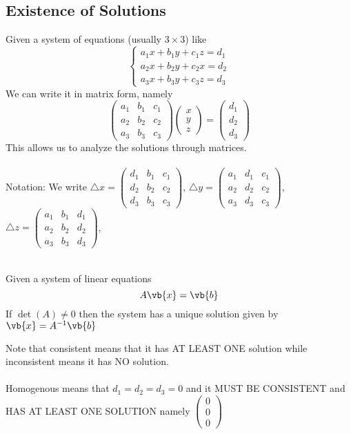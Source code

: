 \documentclass[a4paper]{article}
\begin{document}
\subsection{Existence of Solutions}
Given a system of equations (usually $3\times 3$) like $$\begin{cases}
a_1x+b_1y+c_1z=d_1\\
a_2x+b_2y+c_2x=d_2\\
a_3x+b_3y+c_3z=d_3
\end{cases}$$ We can write it in matrix form, namely $$\begin{pmatrix}
a_1 & b_1 & c_1\\
a_2 & b_2 & c_2\\
a_3 & b_3 & c_3
\end{pmatrix}\begin{pmatrix}
x\\ y\\ z
\end{pmatrix}=\begin{pmatrix}
d_1\\ d_2\\ d_3
\end{pmatrix}$$
This allows us to analyze the solutions through matrices. \\~\\
Notation: We write $\triangle x=\begin{pmatrix}
d_1 & b_1 & c_1\\
d_2 & b_2 & c_2\\
d_3 & b_3 & c_3
\end{pmatrix}$, $\triangle y=\begin{pmatrix}
a_1 & d_1 & c_1\\
a_2 & d_2 & c_2\\
a_3 & d_3 & c_3
\end{pmatrix}$, $\triangle z=\begin{pmatrix}
a_1 & b_1 & d_1\\
a_2 & b_2 & d_2\\
a_3 & b_3 & d_3
\end{pmatrix}$, \\~\\
\begin{prp}{}{} Given a system of linear equations $$A\vb{x}=\vb{b}$$ If $\det(A)\neq 0$ then the system has a unique solution given by $\vb{x}=A^{-1}\vb{b}$
\end{prp}
Note that consistent means that it has AT LEAST ONE solution while inconsistent means it has NO solution. \\~\\
Homogenous means that $d_1=d_2=d_3=0$ and it MUST BE CONSISTENT and HAS AT LEAST ONE SOLUTION namely $\begin{pmatrix}
0\\ 0\\ 0
\end{pmatrix}$
\end{document}
